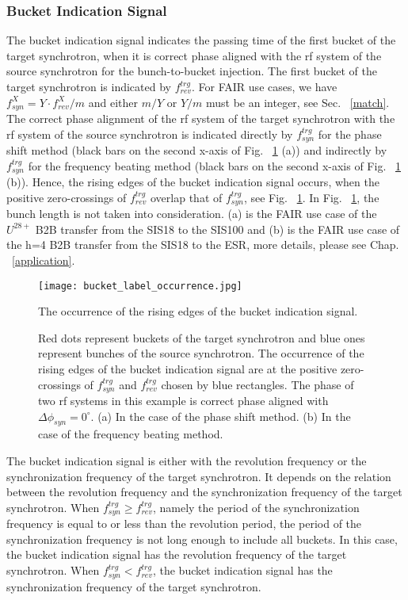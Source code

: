 \subsubsection{Bucket Indication Signal}
The bucket indication signal indicates the passing time of the first bucket of the target synchrotron, when it is correct phase aligned with the rf system of the source synchrotron for the bunch-to-bucket injection. The first bucket of the target synchrotron is indicated by $f_{\mathit{rev}}^{trg}$. For FAIR use cases, we have $f_\mathit{syn}^{X}=Y\cdot f_\mathit{rev}^{X}/m$ and either $m/Y$ or $Y/m$ must be an integer, see Sec. ~\ref{match}. The correct phase alignment of the rf system of the target synchrotron with the rf system of the source synchrotron is indicated directly by $f_{\mathit{syn}}^{trg}$ for the phase shift method (black bars on the second x-axis of Fig. ~\ref{bucket_label_occurrence} (a)) and indirectly by $f_{\mathit{syn}}^{trg}$ for the frequency beating method (black bars on the second x-axis of Fig. ~\ref{bucket_label_occurrence} (b)). Hence, the rising edges of the bucket indication signal occurs, when the positive zero-crossings of $f_{\mathit{rev}}^{trg}$ overlap that of $f_{\mathit{syn}}^{trg}$, see Fig. ~\ref{bucket_label_occurrence}. In Fig. ~\ref{bucket_label_occurrence}, the bunch length is not taken into consideration. (a) is the FAIR use case of the $U^{28+}$ B2B transfer from the SIS18 to the SIS100 and (b) is the FAIR use case of the h=4 B2B transfer from the SIS18 to the ESR, more details, please see Chap. ~\ref{application}.
\begin{figure}[!htb]
   \centering   
   \texttt{[image: bucket\_label\_occurrence.jpg]}
   \caption{The occurrence of the rising edges of the bucket indication signal.}
	\caption*{Red dots represent buckets of the target synchrotron and blue ones represent bunches of the source synchrotron. The occurrence of the rising edges of the bucket indication signal are at the positive zero-crossings of $f_{\mathit{syn}}^{trg}$ and $f_{\mathit{rev}}^{trg}$ chosen by blue rectangles. The phase of two rf systems in this example is correct phase aligned with $\Delta\phi_\mathit{syn}=0^\circ$. (a) In the case of the phase shift method. (b) In the case of the frequency beating method.}
   \label{bucket_label_occurrence}
\end{figure}

The bucket indication signal is either with the revolution frequency or the synchronization frequency of the target synchrotron. It depends on the relation between the revolution frequency and the synchronization frequency of the target synchrotron. When $f_{\mathit{syn}}^{trg}\ge f_{\mathit{rev}}^{trg}$, namely the period of the synchronization frequency is equal to or less than the revolution period, the period of the synchronization frequency is not long enough to include all buckets. In this case, the bucket indication signal has the revolution frequency of the target synchrotron. When $f_{\mathit{syn}}^{trg}<f_{\mathit{rev}}^{trg}$, the bucket indication signal has the synchronization frequency of the target synchrotron. 


